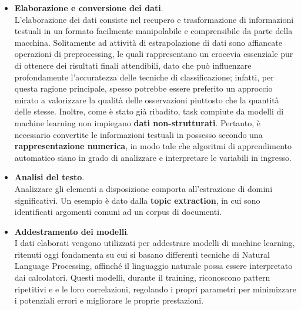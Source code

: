 \begin{itemize}
    \renewcommand{\labelitemi}{-}
    \item \textbf{Elaborazione e conversione dei dati}. \\
    L'elaborazione dei dati consiste nel recupero e trasformazione di informazioni testuali in un formato facilmente manipolabile e comprensibile da parte della macchina. Solitamente ad attività di estrapolazione di dati sono affiancate operazioni di preprocessing, le quali rappresentano un crocevia essenziale pur di ottenere dei risultati finali attendibili, dato che può influenzare profondamente l'accuratezza delle tecniche di classificazione; infatti, per questa ragione principale, spesso potrebbe essere preferito un approccio mirato a valorizzare la qualità delle osservazioni piuttosto che la quantità delle stesse. Inoltre, come è stato già ribadito, task compiute da modelli di machine learning non impiegano \textbf{dati non-strutturati}. Pertanto, è necessario convertite le informazioni testuali in possesso secondo una \textbf{rappresentazione numerica}, in modo tale che algoritmi di apprendimento automatico siano in grado di analizzare e interpretare le variabili in ingresso.
    \item \textbf{Analisi del testo}. \\
    Analizzare gli elementi a disposizione comporta all'estrazione di domini significativi. Un esempio è dato dalla \textbf{topic extraction}, in cui sono identificati argomenti comuni ad un corpus di documenti.
    \item \textbf{Addestramento dei modelli}. \\
    I dati elaborati vengono utilizzati per addestrare modelli di machine learning, ritenuti oggi fondamenta su cui si basano differenti tecniche di Natural Language Processing, affinché il linguaggio naturale possa essere interpretato dai calcolatori. Questi modelli, durante il training, riconoscono pattern ripetitivi e e le loro correlazioni, regolando i propri parametri per minimizzare i potenziali errori e migliorare le proprie prestazioni.
\end{itemize}